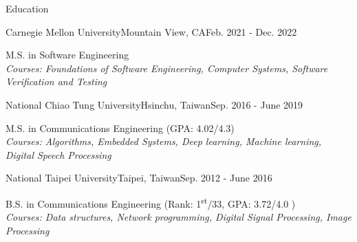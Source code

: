\documentclass{resume_short} %
\newcommand{\ts}{\textsuperscript}
\begin{document}
\vspace{-1em}


\begin{rSection}{Education}
    \begin{rSubsection3}{ Carnegie Mellon University}{Mountain View, CA}{Feb. 2021 - Dec. 2022}
        \item {M.S. in Software Engineering} \\
        {\em Courses: Foundations of Software Engineering, Computer Systems, Software Verification and Testing}
    \end{rSubsection3}
    \begin{rSubsection3}{ National Chiao Tung University}{Hsinchu, Taiwan}{Sep. 2016 - June 2019}
        \item {M.S. in Communications Engineering (GPA: 4.02/4.3)} \\
        {\em Courses: Algorithms, Embedded Systems, Deep learning, Machine learning, Digital Speech Processing}
    \end{rSubsection3}
    \begin{rSubsection3}{ National Taipei University}{Taipei, Taiwan}{Sep. 2012 - June 2016}
        \item {B.S. in Communications Engineering (Rank: 1\ts{st}/33, GPA: 3.72/4.0 )} \\
        {\em Courses: Data structures, Network programming, Digital Signal Processing, Image Processing}
    \end{rSubsection3}
\end{rSection}

\end{document}

